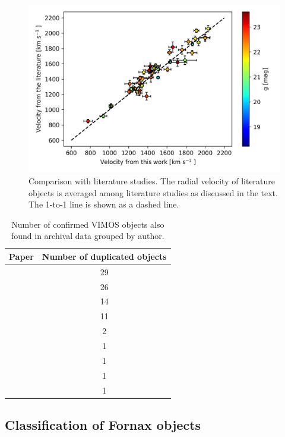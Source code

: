 \documentclass[usenatbib]{mnras}
\begin{document}
\begin{figure}
\centering
\includegraphics[width=\columnwidth]{figures/vel_literature.png} 
\caption{Comparison with literature studies. The radial velocity of literature 
objects is averaged among literature studies as discussed in the text. The 1-to-1 
line is shown as a dashed line. }
\label{fig:vel_comparison}
\end{figure}
 
\begin{table}
\centering
\label{mathmode}
\begin{tabular}{@{}l c}
\hline
Paper & Number of duplicated objects \\
\hline
\citet{Dirsch04}       &  29 \\
\citet{Schuberth}      &  26 \\
\citet{Bergond07}      &  14 \\
\citet{Firth07}        &  11 \\
\citet{Chilingarian11} &  2  \\
\citet{Mieske04}       &  1  \\
\citet{Hilker07}       &  1  \\
\citet{Francis12}      &  1  \\
\citet{Drinkwater00}   &  1  \\
\hline
\end{tabular}
\caption{Number of confirmed VIMOS objects also found in archival data grouped 
by author.}
\label{tab:authors} 
\end{table}

\subsection{Classification of Fornax objects}
\end{document}
